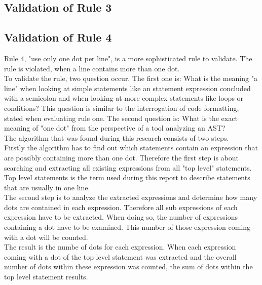 \subsection*{Validation of Rule 3}




\subsection*{Validation of Rule 4}
Rule 4, "use only one dot per line", is a more sophisticated rule to validate. The rule is violated, when a line contains more than one dot. 
\\

To validate the rule, two question occur. The first one is: What is the meaning  "a line" when looking at simple statements like an statement expression concluded with a semicolon and when looking at more complex statements like loops or conditions? This question is similar to the interrogation of code formatting, stated when evaluating rule one. The second question is: What is the exact meaning of "one dot" from the perspective of a tool analyzing an \acf{AST}?
\\

The algorithm that was found during this research consists of two steps. 
\\

Firstly the algorithm has to find out which statements contain an expression that are possibly containing more than one dot. Therefore the first step is about searching and extracting all existing expressions from all "top level" statements. Top level statements is the term used during this report to describe statements that are usually in one line. 
\\

The second step is to analyze the extracted expressions and determine how many dots are contained in each expression. Therefore all sub expressions of each expression have to be extracted. When doing so, the number of expressions containing a dot have to be examined. This number of those expression coming with a dot will be counted. 
\\
The result is the numbe of dots for each expression. When each expression coming with a dot of the top level statement was extracted and the overall number of dots within these expression was counted, the sum of dots within the top level statement results. 
\\

